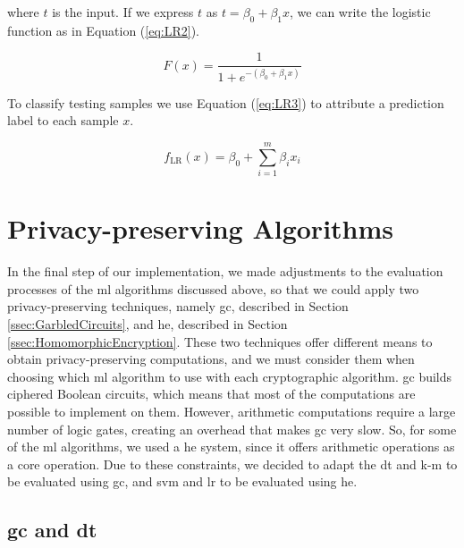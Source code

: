 where $t$ is the input. If we express $t$ as $t=\beta _{0}+\beta _{1}x$, we can write the logistic function as in Equation (\ref{eq:LR2}).

\begin{equation}
\label{eq:LR2}
F(x)={\frac {1}{1+e^{-(\beta _{0}+\beta _{1}x)}}}
\end{equation}


To classify testing samples we use Equation (\ref{eq:LR3}) to attribute a prediction label to each sample $x$.

\begin{equation}
\label{eq:LR3}
f_{\text{LR}}(x)=\beta_0+\sum_{i=1}^m \beta_i x_i
\end{equation}



\section{Privacy-preserving Algorithms}
\label{sec:CryptoDomainImplementation}

In the final step of our implementation, we made adjustments to the evaluation processes of the \ac{ml} algorithms discussed above, so that we could apply two privacy-preserving techniques, namely \ac{gc}, described in Section \ref{ssec:GarbledCircuits}, and \ac{he}, described in Section \ref{ssec:HomomorphicEncryption}.
These two techniques offer different means to obtain privacy-preserving computations, and we must consider them when choosing which \ac{ml} algorithm to use with each cryptographic algorithm. \ac{gc} builds ciphered Boolean circuits, which means that most of the computations are possible to implement on them. However, arithmetic computations require a large number of logic gates, creating an overhead that makes \ac{gc} very slow. So, for some of the \ac{ml} algorithms, we used a \ac{he} system, since it offers arithmetic operations as a core operation. Due to these constraints, we decided to adapt the \ac{dt} and \ac{k-m} to be evaluated using \ac{gc}, and \ac{svm} and \ac{lr} to be evaluated using \ac{he}.


\subsection{\acl{gc} and \acl{dt}}
\label{ssec:GCandDT}

